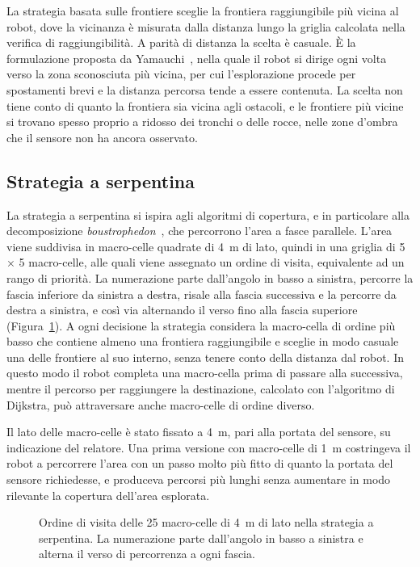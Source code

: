 La strategia basata sulle frontiere sceglie la frontiera raggiungibile più vicina al robot, dove la vicinanza è misurata dalla distanza lungo la griglia calcolata nella verifica di raggiungibilità. A parità di distanza la scelta è casuale. È la formulazione proposta da Yamauchi~\cite{yamauchi1997}, nella quale il robot si dirige ogni volta verso la zona sconosciuta più vicina, per cui l'esplorazione procede per spostamenti brevi e la distanza percorsa tende a essere contenuta. La scelta non tiene conto di quanto la frontiera sia vicina agli ostacoli, e le frontiere più vicine si trovano spesso proprio a ridosso dei tronchi o delle rocce, nelle zone d'ombra che il sensore non ha ancora osservato.

\subsection{Strategia a serpentina}
\label{sec:serpentina}

La strategia a serpentina si ispira agli algoritmi di copertura, e in particolare alla decomposizione \textit{boustrophedon}~\cite{choset2000}, che percorrono l'area a fasce parallele. L'area viene suddivisa in macro-celle quadrate di 4~m di lato, quindi in una griglia di 5 $\times$ 5 macro-celle, alle quali viene assegnato un ordine di visita, equivalente ad un rango di priorità. La numerazione parte dall'angolo in basso a sinistra, percorre la fascia inferiore da sinistra a destra, risale alla fascia successiva e la percorre da destra a sinistra, e così via alternando il verso fino alla fascia superiore (Figura~\ref{fig:serpentina}). A ogni decisione la strategia considera la macro-cella di ordine più basso che contiene almeno una frontiera raggiungibile e sceglie in modo casuale una delle frontiere al suo interno, senza tenere conto della distanza dal robot. In questo modo il robot completa una macro-cella prima di passare alla successiva, mentre il percorso per raggiungere la destinazione, calcolato con l'algoritmo di Dijkstra, può attraversare anche macro-celle di ordine diverso.

Il lato delle macro-celle è stato fissato a 4~m, pari alla portata del sensore, su indicazione del relatore. Una prima versione con macro-celle di 1~m costringeva il robot a percorrere l'area con un passo molto più fitto di quanto la portata del sensore richiedesse, e produceva percorsi più lunghi senza aumentare in modo rilevante la copertura dell'area esplorata.

\begin{figure}[!htb]
    \centering
    
    \caption[Ordine di visita delle macro-celle nella strategia a serpentina]{Ordine di visita delle 25 macro-celle di 4~m di lato nella strategia a serpentina. La numerazione parte dall'angolo in basso a sinistra e alterna il verso di percorrenza a ogni fascia.}
    \label{fig:serpentina}
\end{figure}

